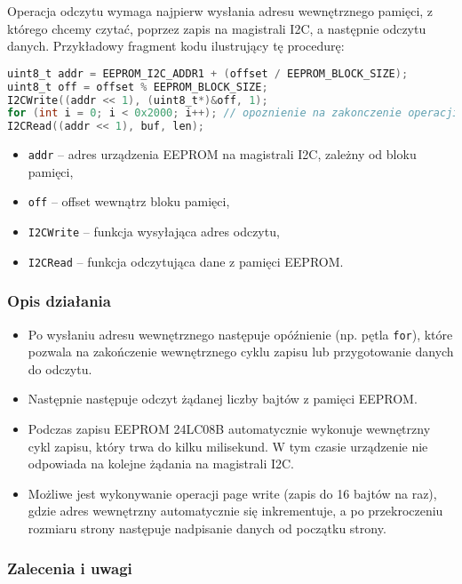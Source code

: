 \documentclass[a4paper,12pt]{report}
\begin{document}
Operacja odczytu wymaga najpierw wysłania adresu wewnętrznego pamięci, z którego chcemy czytać, poprzez zapis na magistrali I2C, a następnie odczytu danych. Przykładowy fragment kodu ilustrujący tę procedurę:

\begin{lstlisting}[language=C]
uint8_t addr = EEPROM_I2C_ADDR1 + (offset / EEPROM_BLOCK_SIZE);
uint8_t off = offset % EEPROM_BLOCK_SIZE;
I2CWrite((addr << 1), (uint8_t*)&off, 1);
for (int i = 0; i < 0x2000; i++); // opoznienie na zakonczenie operacji
I2CRead((addr << 1), buf, len);
\end{lstlisting}

\begin{itemize}
    \item \texttt{addr} – adres urządzenia EEPROM na magistrali I2C, zależny od bloku pamięci,
    \item \texttt{off} – offset wewnątrz bloku pamięci,
    \item \texttt{I2CWrite} – funkcja wysyłająca adres odczytu,
    \item \texttt{I2CRead} – funkcja odczytująca dane z pamięci EEPROM.
\end{itemize}

\subsubsection*{Opis działania}

\begin{itemize}
    \item Po wysłaniu adresu wewnętrznego następuje opóźnienie (np. pętla \texttt{for}), które pozwala na zakończenie wewnętrznego cyklu zapisu lub przygotowanie danych do odczytu.
    \item Następnie następuje odczyt żądanej liczby bajtów z pamięci EEPROM.
    \item Podczas zapisu EEPROM 24LC08B automatycznie wykonuje wewnętrzny cykl zapisu, który trwa do kilku milisekund. W tym czasie urządzenie nie odpowiada na kolejne żądania na magistrali I2C.
    \item Możliwe jest wykonywanie operacji page write (zapis do 16 bajtów na raz), gdzie adres wewnętrzny automatycznie się inkrementuje, a po przekroczeniu rozmiaru strony następuje nadpisanie danych od początku strony.
\end{itemize}

\subsubsection*{Zalecenia i uwagi}
\end{document}
